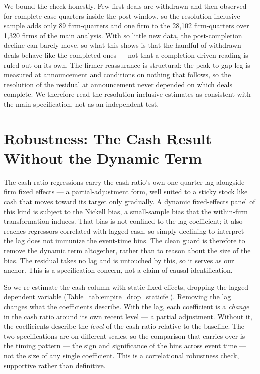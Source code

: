 We bound the check honestly. Few first deals are withdrawn and then observed for complete-case quarters inside the post window, so the resolution-inclusive sample adds only 89 firm-quarters and one firm to the 28,102 firm-quarters over 1,320 firms of the main analysis. With so little new data, the post-completion decline can barely move, so what this shows is that the handful of withdrawn deals behave like the completed ones --- not that a completion-driven reading is ruled out on its own. The firmer reassurance is structural: the peak-to-gap leg is measured at announcement and conditions on nothing that follows, so the resolution of the residual at announcement never depended on which deals complete. We therefore read the resolution-inclusive estimates as consistent with the main specification, not as an independent test.

\section{Robustness: The Cash Result Without the Dynamic Term}

The cash-ratio regressions carry the cash ratio's own one-quarter lag alongside firm fixed effects --- a partial-adjustment form, well suited to a sticky stock like cash that moves toward its target only gradually. A dynamic fixed-effects panel of this kind is subject to the Nickell bias, a small-sample bias that the within-firm transformation induces. That bias is not confined to the lag coefficient; it also reaches regressors correlated with lagged cash, so simply declining to interpret the lag does not immunize the event-time bins. The clean guard is therefore to remove the dynamic term altogether, rather than to reason about the size of the bias. The residual takes no lag and is untouched by this, so it serves as our anchor. This is a specification concern, not a claim of causal identification.

So we re-estimate the cash column with static fixed effects, dropping the lagged dependent variable (Table~\ref{tab:empire_drop_staticfe}). Removing the lag changes what the coefficients describe. With the lag, each coefficient is a \emph{change} in the cash ratio around its own recent level --- a partial adjustment. Without it, the coefficients describe the \emph{level} of the cash ratio relative to the baseline. The two specifications are on different scales, so the comparison that carries over is the timing pattern --- the sign and significance of the bins across event time --- not the size of any single coefficient. This is a correlational robustness check, supportive rather than definitive.

